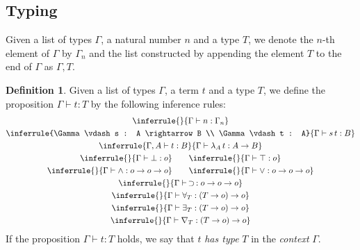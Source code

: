 \documentclass[a4paper]{article}
\theoremstyle{definition}
\newtheorem{definition}{Definition}
\newcommand*{\ifempty}[3]{\ifthenelse{\equal{#1}{}}{#2}{#3}}
\newcommand*{\lvln}{n}
\newcommand*{\tyarr}[2]{#1 \rightarrow #2}
\newcommand*{\typrp}{o}
\newcommand*{\tpquant}[2]{#1_{#2}}
\newcommand*{\tmapp}[2]{#1 \, #2}
\newcommand*{\tmabs}[2]{\tpquant{\lambda}{#1} \, #2}
\newcommand*{\tmimp}[2]{\ifempty{#1}{\,}{#1} \supset \ifempty{#2}{\,}{#2}}
\newcommand*{\tmfors}[1]{\tpquant{\forall}{#1}}
\newcommand*{\tmexs}[1]{\tpquant{\exists}{#1}}
\newcommand*{\tmnabs}[1]{\tpquant{\nabla}{#1}}
\newcommand*{\hastype}[3]{#1 \vdash #2 : #3}
\newcommand*{\nth}[2]{#1_{#2}}
\newcommand*{\listappel}[2]{#1, #2}
\begin{document}
\subsection{Typing}

Given a list of types $\Gamma$, a natural number $n$ and a type $T$, we denote the $n$-th element of $\Gamma$ by $\nth{\Gamma}{n}$ and the list constructed by appending the element $T$ to the end of $\Gamma$ as $\listappel{\Gamma}{T}$.

\begin{definition}
    Given a list of types $\Gamma$, a term $t$ and a type $T$, we define the proposition $\hastype{\Gamma}{t}{T}$ by the following inference rules:
    \begin{gather*}
        \inferrule{ }{\hastype{\Gamma}{\lvln}{\nth{\Gamma}{\lvln}}} \\
        \inferrule{\hastype{\Gamma}{s}{\tyarr{A}{B}} \\ \hastype{\Gamma}{t}{A}}{\hastype{\Gamma}{\tmapp{s}{t}}{B}} \\
        \inferrule{\hastype{\listappel{\Gamma}{A}}{t}{B}}{\hastype{\Gamma}{\tmabs{A}{t}}{\tyarr{A}{B}}} \\
        \inferrule{ }{\hastype{\Gamma}{\bot}{\typrp}} \qquad
        \inferrule{ }{\hastype{\Gamma}{\top}{\typrp}} \\
        \inferrule{ }{\hastype{\Gamma}{\land}{\tyarr{\typrp}{\tyarr{\typrp}{\typrp}}}} \qquad
        \inferrule{ }{\hastype{\Gamma}{\lor}{\tyarr{\typrp}{\tyarr{\typrp}{\typrp}}}} \\
        \inferrule{ }{\hastype{\Gamma}{\tmimp{\,}{\,}}{\tyarr{\typrp}{\tyarr{\typrp}{\typrp}}}} \\
        \inferrule{ }{\hastype{\Gamma}{\tmfors{T}}{\tyarr{(\tyarr{T}{\typrp})}{\typrp}}} \\
        \inferrule{ }{\hastype{\Gamma}{\tmexs{T}}{\tyarr{(\tyarr{T}{\typrp})}{\typrp}}} \\
        \inferrule{ }{\hastype{\Gamma}{\tmnabs{T}}{\tyarr{(\tyarr{T}{\typrp})}{\typrp}}}
    \end{gather*}
    If the proposition $\hastype{\Gamma}{t}{T}$ holds, we say that $t$ \emph{has type} $T$ in the \emph{context} $\Gamma$.
\end{definition}
\end{document}
